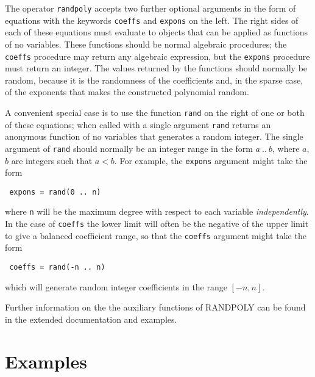 The operator {\tt randpoly} accepts two further optional arguments in
the form of equations with the keywords {\tt coeffs}
 and {\tt expons}
on the left.  The right sides of each of these equations must evaluate
to objects that can be applied as functions of no variables.  These
functions should be normal algebraic procedures; the {\tt coeffs}
procedure may return any algebraic expression, but the {\tt expons}
procedure must return an integer.  The values returned by
the functions should normally be random, because it is the randomness
of the coefficients and, in the sparse case, of the exponents that
makes the constructed polynomial random.

A convenient special case is to use the function {\tt rand} on the
right of one or both of these equations; when called with a single
argument {\tt rand} returns an anonymous function of no variables that
generates a random integer.  The single argument of {\tt rand} should
normally be an integer range in the form $a~..~b$, where $a$, $b$ are
integers such that $a < b$.   For example, the {\tt expons} argument might
take the form
\begin{center}\tt
  expons = rand(0~..~n)
\end{center}
where {\tt n} will be the maximum degree with respect to each variable
{\em independently}.  In the case of {\tt coeffs} the lower limit will
often be the negative of the upper limit to give a balanced
coefficient range, so that the {\tt coeffs} argument might take the
form
\begin{center}\tt
  coeffs = rand(-n~..~n)
\end{center}
which will generate random integer coefficients in the range $[-n,n]$.

Further information on the the auxiliary functions of RANDPOLY can be
found in the extended documentation and examples.

\section{Examples}
\label{sec:Examples}

